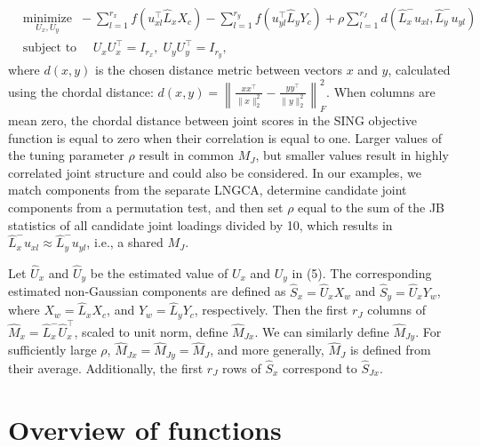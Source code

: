 \begin{equation}
\begin{split}
& \underset{U_{x}, U_{y}}{\text{minimize}}\;\;-\sum_{l=1}^{r_{x}} f(u_{x l}^{\top} \widehat{L}_{x}X_{c})-\sum_{l=1}^{r_{y}} f(u_{y l}^{\top} \widehat{L}_{y}Y_{c})+\rho \sum_{l=1}^{r_{J}} d(\widehat{L}_{x}^{-} u_{x l}, \widehat{L}_{y}^{-} u_{y l}) \\
& \text{subject to } \quad  U_{x} U_{x}^{\top}=I_{r_{x}},\; U_{y} U_{y}^{\top}=I_{r_{y}},
\end{split}
\label{eq:curvilinear}
\end{equation}
where \(d(x,y)\) is the chosen distance metric between vectors \(x\) and \(y\), calculated using the chordal distance: \(d(x, y)=\left\|\frac{x x^{\top}}{\|x\|_{2}^{2}}-\frac{y y^{\top}}{\|y\|_{2}^{2}}\right\|_{F}^{2}\). When columns are mean zero, the chordal distance between joint scores in the SING objective function is equal to zero when their correlation is equal to one. Larger values of the tuning parameter \(\rho\) result in common \(M_J\), but smaller values result in highly correlated joint structure and could also be considered. In our examples, we match components from the separate LNGCA, determine candidate joint components from a permutation test, and then set \(\rho\) equal to the sum of the JB statistics of all candidate joint loadings divided by 10, which results in \(\widehat{L}_{x}^{-} u_{x l} \approx \widehat{L}_{y}^{-} u_{y l}\), i.e., a shared \(M_J\).

Let \(\widehat{U}_{x}\) and \(\widehat{U}_{y}\) be the estimated value of \(U_{x}\) and \(U_{y}\) in (5). The corresponding estimated non-Gaussian components are defined as \(\widehat{S}_{x}=\widehat{U}_{x}X_{w}\) and \(\widehat{S}_{y}=\widehat{U}_{x}Y_{w}\), where \(X_{w}=\widehat{L}_{x}X_{c}\), and \(Y_{w}=\widehat{L}_{y}Y_{c}\), respectively. Then the first \(r_{J}\) columns of \(\widehat{M}_{x}=\widehat{L}_{x}^{-}\widehat{U}_{x}^{\top}\), scaled to unit norm, define \(\widehat{M}_{Jx}\). We can similarly define \(\widehat{M}_{Jy}\). For sufficiently large \(\rho\), \(\widehat{M}_{Jx}=\widehat{M}_{Jy}=\widehat{M}_J\), and more generally, \(\widehat{M}_J\) is defined from their average. Additionally, the first \(r_{J}\) rows of \(\widehat{S}_{x}\) correspond to \(\widehat{S}_{Jx}\).

\hypertarget{overview-of-functions}{%
\section{Overview of functions}\label{overview-of-functions}}

